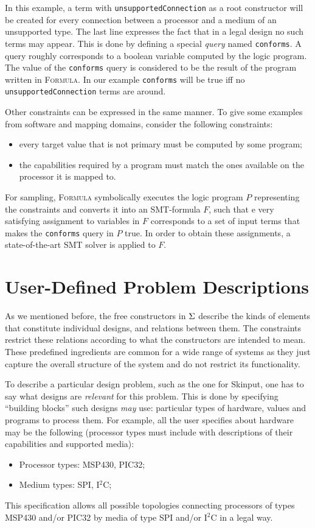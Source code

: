 \documentclass[conference]{IEEEtran}
\newcommand{\FORMULA}{\textsc{Formula}}
\begin{document}
In this example, a term with \texttt{unsupportedConnection} as a root constructor will be created for every connection between a processor and a medium of an unsupported type. The last line expresses the fact that in a legal design no such terms may appear. This is done by defining a special \emph{query} named \texttt{conforms}. A query roughly corresponds to a boolean variable computed by the logic program. The value of the \texttt{conforms} query is considered to be the result of the program written in \FORMULA{}. In our example \texttt{conforms} will be true iff no  \texttt{unsupportedConnection} terms are around.

Other constraints can be expressed in the same manner. To give some examples from software and mapping domains, consider the following constraints:
\begin{itemize}
  \item every target value that is not primary must be computed by some program;
  \item the capabilities required by a program must match the ones available on the processor it is mapped to.
\end{itemize}

For sampling, \FORMULA{} symbolically executes the logic program $P$ representing the constraints and converts it into an SMT-formula $F$, such that e
very satisfying assignment to variables in $F$ corresponds to a set of input terms that makes the \texttt{conforms} query in $P$ true. In order to obtain these assignments, a state-of-the-art SMT solver is applied to $F$.

\section{User-Defined Problem Descriptions}

As we mentioned before, the free constructors in $\Sigma$ describe the kinds of elements that constitute individual designs, and relations between them. The constraints restrict these relations according to what the constructors are intended to mean. These predefined ingredients are common for a wide range of systems as they just capture the overall structure of the system and do not restrict its functionality. 

To describe a particular design problem, such as the one for Skinput, one has to say what designs are \emph{relevant} for this problem. This is done by specifying ``building blocks'' such designs \emph{may} use: particular types of hardware, values and programs to process them. For example, all the user specifies about hardware may be the following (processor types must include with descriptions of their capabilities and supported media):
\begin{itemize}
  \item Processor types: MSP430, PIC32;
  \item Medium types: SPI, I$^2$C;
\end{itemize}
This specification allows all possible topologies connecting processors of types MSP430 and/or PIC32 by media of type SPI and/or I$^2$C in a legal way.
\end{document}
